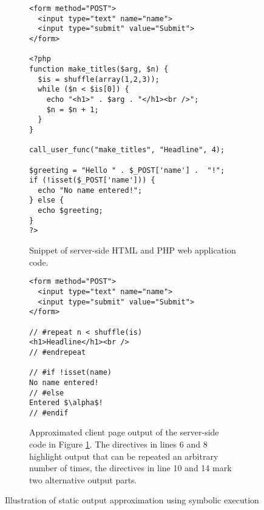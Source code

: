 \documentclass[sigconf, preprint]{acmart}
\begin{document}
\begin{figure}[t]
	\centering
	\begin{subfigure}[center]{0.48\textwidth}%
\begin{lstlisting}
<form method="POST">
  <input type="text" name="name">
  <input type="submit" value="Submit">
</form>

<?php
function make_titles($arg, $n) {
  $is = shuffle(array(1,2,3));
  while ($n < $is[0]) {
    echo "<h1>" . $arg . "</h1><br />";
    $n = $n + 1;
  }
}
  
call_user_func("make_titles", "Headline", 4);

$greeting = "Hello " . $_POST['name'] .  "!";
if (!isset($_POST['name'])) {
  echo "No name entered!";
} else {
  echo $greeting;
}
?>
\end{lstlisting}
		\caption{Snippet of server-side HTML and PHP web application code.
		\label{fig:web_application}}
    \end{subfigure}

	\vspace{2mm}    
    
    \begin{subfigure}[center]{0.48\textwidth}
\begin{lstlisting}[mathescape]
<form method="POST">
  <input type="text" name="name">
  <input type="submit" value="Submit">
</form>

// #repeat n < shuffle(is)
<h1>Headline</h1><br />
// #endrepeat

// #if !isset(name)
No name entered!
// #else
Entered $\alpha$!
// #endif

\end{lstlisting}
		\caption{
			Approximated client page output of the server-side code in Figure
			\ref{fig:web_application}. The directives in lines 6 and 8 highlight output
			that can be repeated an arbitrary number of times, the directives in line 10
			and 14 mark two alternative output parts.
			\label{fig:output_example}
		}
    \end{subfigure}
    \caption{
    	Illustration of static output approximation using symbolic
    	execution
    	\label{fig:code_example}
    }
\end{figure}
\end{document}
